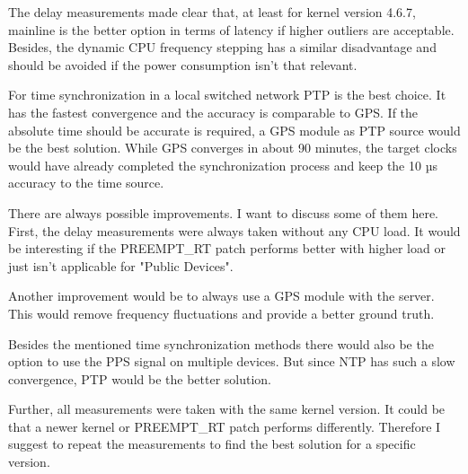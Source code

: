 The delay measurements made clear that, at least for kernel version 4.6.7, mainline is the better option in terms of latency if higher outliers are acceptable. Besides, the dynamic CPU frequency stepping has a similar disadvantage and should be avoided if the power consumption isn’t that relevant.

For time synchronization in a local switched network PTP is the best choice. It has the fastest convergence and the accuracy is comparable to GPS. If the absolute time should be accurate is required, a GPS module as PTP source would be the best solution. While GPS converges in about 90 minutes, the target clocks would have already completed the synchronization process and keep the 10 µs accuracy to the time source.

There are always possible improvements. I want to discuss some of them here.
First, the delay measurements were always taken without any CPU load. It would be interesting if the PREEMPT\_RT patch performs better with higher load or just isn’t applicable for "Public Devices".

Another improvement would be to always use a GPS module with the server. This would remove frequency fluctuations and provide a better ground truth.

Besides the mentioned time synchronization methods there would also be the option to use the PPS signal on multiple devices. But since NTP has such a slow convergence, PTP would be the better solution.

Further, all measurements were taken with the same kernel version. It could be that a newer kernel or PREEMPT\_RT patch performs differently. Therefore I suggest to repeat the measurements to find the best solution for a specific version.
